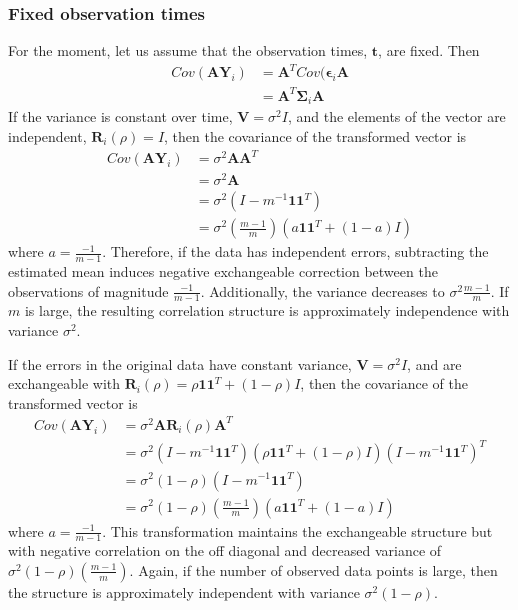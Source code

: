 \documentclass[12pt]{article}
\newcommand{\B}[0]{\mathbf}
\newcommand{\bs}[0]{\boldsymbol}
\begin{document}
\subsubsection{Fixed observation times}
For the moment, let us assume that the observation times, $\B t$, are fixed. Then
\begin{align*}
Cov(\B A\B Y_{i})&= \B A^{T}Cov(\bs\epsilon_{i}\B A\\
&= \B A^{T}\B\Sigma_{i} \B A
\end{align*}
If the variance is constant over time, $\B V=\sigma^{2}I$, and the elements of the vector are independent, $\B R_{i}(\rho)=I$, then the covariance of the transformed vector is
\begin{align*} 
Cov(\B A\B Y_{i}) &= \sigma^{2}\B A\B A^{T} \\
&=\sigma^{2}\B A\\
&= \sigma^{2}(I - m^{-1}\B1\B1^{T})\\
&=\sigma^{2}\left(\frac{m-1}{m}\right)(a\B 1\B 1^{T}+ (1-a)I)
\end{align*}
 where $a=\frac{-1}{m-1}$. Therefore, if the data has independent errors, subtracting the estimated mean induces negative exchangeable correction between the observations of magnitude $\frac{-1}{m-1}$. Additionally, the variance decreases to $\sigma^{2}\frac{m-1}{m}$. If $m$ is large, the resulting correlation structure is approximately independence with variance $\sigma^{2}$.
 
 If the errors in the original data have constant variance, $\B V=\sigma^{2}I$, and are exchangeable with $\B R_{i}(\rho) = \rho\B 1 \B 1^{T} + (1-\rho) I$, then the covariance of the transformed vector is
 \begin{align*}
 Cov(\B A\B Y_{i}) &= \sigma^{2}\B A\B R_{i}(\rho)\B A^{T}\\
 &= \sigma^{2}(I-m^{-1}\B1\B1^{T})(\rho\B1\B1^{T}+(1-\rho)I)(I-m^{-1}\B1\B1^{T})^{T}\\
 &= \sigma^{2}(1-\rho)(I-m^{-1}\B1\B1^{T})\\
 &=\sigma^{2}(1-\rho)\left(\frac{m-1}{m}\right)(a\B 1\B 1^{T}+ (1-a)I)
 \end{align*} 
 where $a=\frac{-1}{m-1}$. This transformation maintains the exchangeable structure but with negative correlation on the off diagonal and decreased variance of $\sigma^{2}(1-\rho)\left(\frac{m-1}{m}\right)$.  Again, if the number of observed data points is large, then the structure is approximately independent with variance $\sigma^{2}(1-\rho)$.
\end{document}
